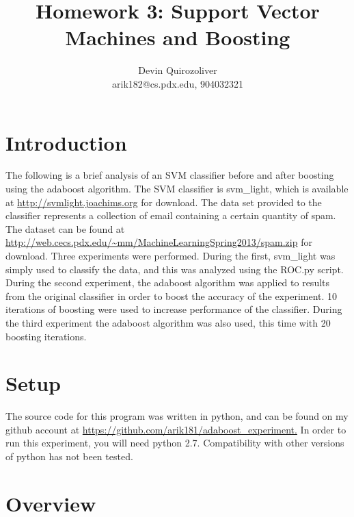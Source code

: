 \documentclass[titlepage,11pt]{article}
\title{Homework 3: Support Vector Machines and Boosting}
\author{Devin Quirozoliver\\arik182@cs.pdx.edu, 904032321}
\begin{document}
\maketitle

\section[1]{Introduction} {
\vspace{2pt} \hspace{2pt} The following is a brief analysis of an SVM classifier before and after boosting using the adaboost algorithm. The SVM classifier is svm\_light, which is available at \url{http://svmlight.joachims.org} for download. The data set provided to the classifier represents a collection of email containing a certain quantity of spam. The dataset can be found at \url{http://web.cecs.pdx.edu/~mm/MachineLearningSpring2013/spam.zip} for download. Three experiments were performed. During the first, svm\_light was simply used to classify the data, and this was analyzed using the ROC.py script. During the second experiment, the adaboost algorithm was applied to results from the original classifier in order to boost the accuracy of the experiment. 10 iterations of boosting were used to increase performance of the classifier. During the third experiment the adaboost algorithm was also used, this time with 20 boosting iterations.
}

\section[2]{Setup} {
\vspace{2pt} \hspace{2pt} The source code for this program was written in python, and can be found on my github account at \url{https://github.com/arik181/adaboost\_experiment.} In order to run this experiment, you will need python 2.7. Compatibility with other versions of python has not been tested.
}

\section[3]{Overview} {
}
\end{document}
